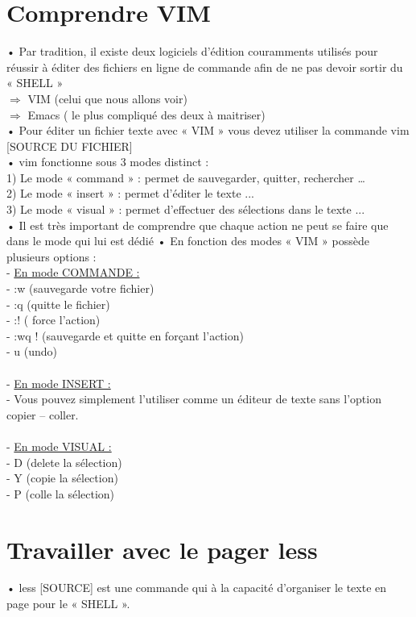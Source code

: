 \documentclass[a4paper, 11pt, french, oneside]{book}
\begin{document}
		\section{Comprendre VIM} 
			• Par tradition, il existe deux logiciels d’édition couramments utilisés pour réussir à éditer des fichiers en ligne de commande afin de ne pas devoir sortir du « SHELL »\\
			$\Rightarrow$ VIM (celui que nous allons voir)\\
			$\Rightarrow$ Emacs ( le plus compliqué des deux à maitriser)\\
			• Pour éditer un fichier texte avec « VIM » vous devez utiliser la commande vim [SOURCE DU FICHIER]\\
			• vim fonctionne sous 3 modes distinct :\\
			1) Le mode « command » : permet de sauvegarder, quitter, rechercher …\\
			2) Le mode « insert » : permet d’éditer le texte ...\\
			3) Le mode « visual » : permet d’effectuer des sélections dans le texte ...\\
			• Il est très important de comprendre que chaque action ne peut se faire que dans le mode qui lui est dédié
			• En fonction des modes « VIM » possède plusieurs options :\\
			- \underline{En mode COMMANDE :}\\
			- :w (sauvegarde votre fichier)\\
			- :q (quitte le fichier)\\
			- :! ( force l’action)\\
			- :wq ! (sauvegarde et quitte en forçant l’action)\\
			- u (undo)\\\\
			- \underline{En mode INSERT :}\\
			- Vous pouvez simplement l’utiliser comme un éditeur de texte sans l’option copier – coller.\\\\
			- \underline{En mode VISUAL :}\\
			- D (delete la sélection)\\
			- Y (copie la sélection)\\
			- P (colle la sélection)\\
		\section{Travailler avec le pager less} 
			• less [SOURCE] est une commande qui à la capacité d’organiser le texte en page pour le « SHELL ». \\
\end{document}
